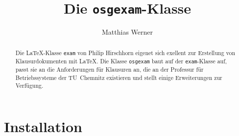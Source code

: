 \documentclass{ltxdoc}
\begin{document}
\title{Die \verb!osgexam!-Klasse}
\author{Matthias Werner}
\maketitle

\begin{abstract}
    Die \LaTeX-Klasse \verb!exam! von \textsf{Philip Hirschhorn} eigenet sich exellent zur Erstellung von
    Klausurdokumenten mit \LaTeX. Die Klasse \verb!osgexam! baut auf der \verb!exam!-Klasse auf, passt sie an die
    Anforderungen für Klausuren an, die an der Professur für Betriebssysteme der TU~Chemnitz existieren und stellt
    einige Erweiterungen zur Verfügung.
\end{abstract}

\section{Installation}
\end{document}
